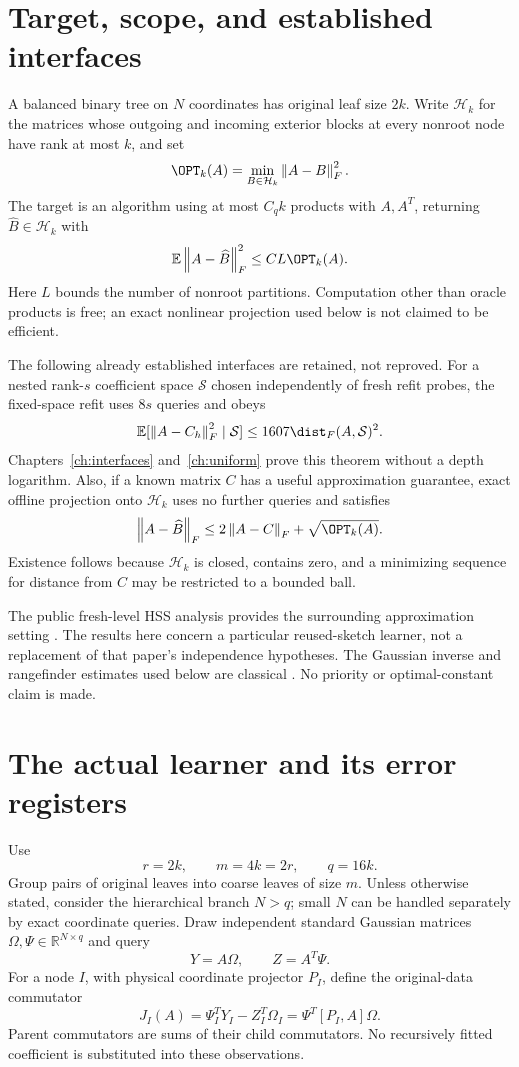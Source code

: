 \documentclass[11pt,oneside,openany,a4paper]{book}
\numberwithin{equation}{chapter}
\theoremstyle{definition}
\theoremstyle{remark}
\newcommand{\R}{\mathbb R}\newcommand{\E}{\mathbb E}\newcommand{\Prb}{\mathbb P}\newcommand{\PP}{\mathbb P}
\newcommand{\F}[1]{\left\lVert#1\right\rVert_F}
\newcommand{\HH}{\mathcal H}\newcommand{\SSS}{\mathcal S}
\begin{document}
\section{Target, scope, and established interfaces}
A balanced binary tree on $N$ coordinates has original leaf size $2k$. Write $\HH_k$ for the matrices whose outgoing and incoming exterior blocks at every nonroot node have rank at most $k$, and set
\[
 \OPT_k(A)=\min_{B\in\HH_k}\F{A-B}^2.
\]
The target is an algorithm using at most $C_qk$ products with $A,A^T$, returning $\widehat B\in\HH_k$ with
\begin{equation}\label{return:eq:target}
 \E\F{A-\widehat B}^2\le CL\OPT_k(A).
\end{equation}
Here $L$ bounds the number of nonroot partitions. Computation other than oracle products is free; an exact nonlinear projection used below is not claimed to be efficient.

The following already established interfaces are retained, not reproved. For a nested rank-$s$ coefficient space $\SSS$ chosen independently of fresh refit probes, the fixed-space refit uses $8s$ queries and obeys
\begin{equation}\label{return:eq:refit}
 \E[\F{A-C_h}^2\mid\SSS]\le1607\dist_F(A,\SSS)^2.
\end{equation}
Chapters~\ref{ch:interfaces} and~\ref{ch:uniform} prove this theorem without a depth logarithm. Also, if a known matrix $C$ has a useful approximation guarantee, exact offline projection onto $\HH_k$ uses no further queries and satisfies
\begin{equation}\label{return:eq:projection}
 \F{A-\widehat B}\le2\F{A-C}+\sqrt{\OPT_k(A)}.
\end{equation}
Existence follows because $\HH_k$ is closed, contains zero, and a minimizing sequence for distance from $C$ may be restricted to a bounded ball.

The public fresh-level HSS analysis provides the surrounding approximation setting \cite{AmselHSS}. The results here concern a particular reused-sketch learner, not a replacement of that paper's independence hypotheses. The Gaussian inverse and rangefinder estimates used below are classical \cite{HMT}. No priority or optimal-constant claim is made.

\section{The actual learner and its error registers}
Use
\[
 r=2k,\qquad m=4k=2r,\qquad q=16k.
\]
Group pairs of original leaves into coarse leaves of size $m$. Unless otherwise stated, consider the hierarchical branch $N>q$; small $N$ can be handled separately by exact coordinate queries. Draw independent standard Gaussian matrices $\Omega,\Psi\in\R^{N\times q}$ and query
\[
 Y=A\Omega,\qquad Z=A^T\Psi.
\]
For a node $I$, with physical coordinate projector $P_I$, define the original-data commutator
\begin{equation}\label{return:eq:J}
 J_I(A)=\Psi_I^TY_I-Z_I^T\Omega_I
       =\Psi^T[P_I,A]\Omega.
\end{equation}
Parent commutators are sums of their child commutators. No recursively fitted coefficient is substituted into these observations.
\end{document}
